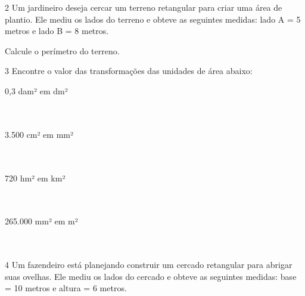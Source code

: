 \num{2} Um jardineiro deseja cercar um terreno retangular para criar uma área
de plantio. Ele mediu os lados do terreno e obteve as seguintes medidas:
lado A = 5 metros e lado B = 8 metros.

Calcule o perímetro do terreno.


\num{3} Encontre o valor das transformações das unidades de área abaixo:

\begin{multicols}{2}
\begin{escolha}[itemsep=0pt]

\item 0,3 dam² em dm² \\
 \\ \\

\item 3.500 cm² em mm² \\
 \\ \\

\item 720 hm² em km² \\
 \\ \\

\item 265.000 mm² em m² \\
 \\ \\

\end{escolha}
\end{multicols}


\num{4} Um fazendeiro está planejando construir um cercado retangular para
abrigar suas ovelhas. Ele mediu os lados do cercado e obteve as
seguintes medidas: base = 10 metros e altura = 6 metros.

